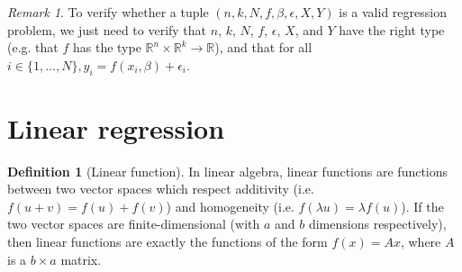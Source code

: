 \documentclass{article}
\theoremstyle{definition}
\newtheorem{definition}{Definition}[section]
\theoremstyle{remark}
\newtheorem*{remark}{Remark}
\theoremstyle{example}
\begin{document}
\begin{remark}
		To verify whether a tuple $(n, k, N, f, \beta, \epsilon, X, Y)$ is a valid regression problem, we just need to verify that $n$, $k$, $N$, $f$, $\epsilon$, $X$, and $Y$ have the right type (e.g. that $f$ has the type $\mathbb{R}^n \times \mathbb{R}^k \rightarrow \mathbb{R}$), and that for all $i \in \{1, \dots, N\}, y_i = f(x_i, \beta) + \epsilon_i$.
\end{remark}

\section{Linear regression}

\begin{definition}[Linear function]
    In linear algebra, linear functions are functions between two vector spaces which respect additivity (i.e. $f(u + v) = f(u) + f(v)$) and homogeneity (i.e. $f(\lambda u) = \lambda f(u)$). If the two vector spaces are finite-dimensional (with $a$ and $b$ dimensions respectively), then linear functions are exactly the functions of the form $f(x) = Ax$, where $A$ is a $b \times a$ matrix.
\end{definition}
\end{document}
